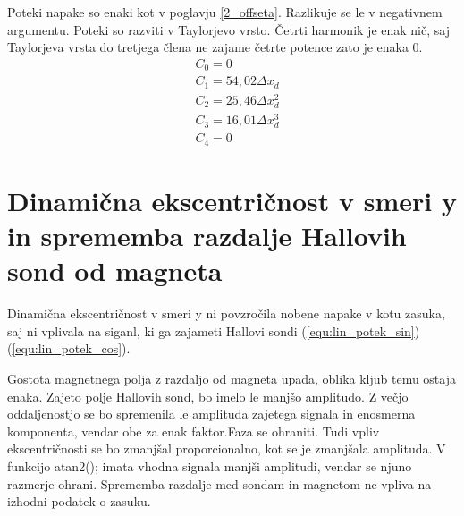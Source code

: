 Poteki napake so enaki kot v poglavju \ref{2_offseta}. Razlikuje se le v negativnem argumentu. Poteki so razviti v Taylorjevo vrsto. Četrti harmonik je enak nič, saj Taylorjeva vrsta do tretjega člena ne zajame četrte potence zato je enaka 0.
\begin{eqnarray}
&C_0 =0\\
&C_1 =54,02\Delta x_d\\     
&C_2 =25,46\Delta x_d^{2}\\             
&C_3 =16,01\Delta x_d^{3}\\         
&C_4 =0            
\end{eqnarray}
\section{Dinamična ekscentričnost v smeri y in sprememba razdalje Hallovih sond od magneta }
Dinamična ekscentričnost v smeri y ni povzročila nobene napake v kotu zasuka, saj ni vplivala na siganl, ki ga zajameti Hallovi sondi (\ref{equ:lin_potek_sin})(\ref{equ:lin_potek_cos}).

Gostota magnetnega polja z razdaljo od magneta upada, oblika kljub temu ostaja enaka. Zajeto polje Hallovih sond, bo imelo le manjšo amplitudo. Z večjo oddaljenostjo se bo spremenila le amplituda zajetega signala in enosmerna komponenta, vendar obe za enak faktor.Faza se ohraniti. Tudi vpliv ekscentričnosti se bo zmanjšal proporcionalno, kot se je zmanjšala amplituda. V funkcijo atan2(); imata vhodna signala manjši amplitudi, vendar se njuno razmerje ohrani. Sprememba razdalje med sondam in magnetom ne vpliva na izhodni podatek o zasuku.